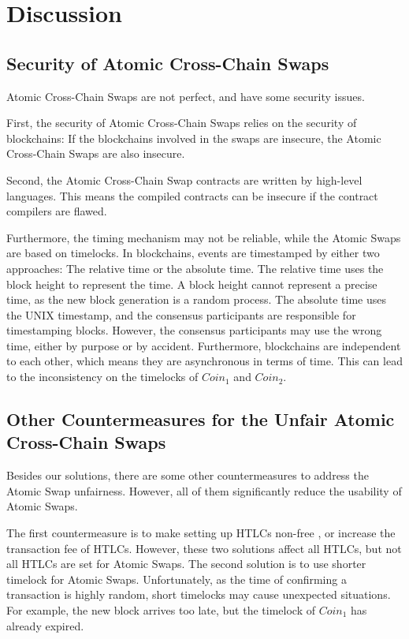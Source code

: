 \section{Discussion}
\label{sec:discussion}

\subsection{Security of Atomic Cross-Chain Swaps}

Atomic Cross-Chain Swaps are not perfect, and have some security issues.

First, the security of Atomic Cross-Chain Swaps relies on the security of blockchains:
If the blockchains involved in the swaps are insecure, the Atomic Cross-Chain Swaps are also insecure.

Second, the Atomic Cross-Chain Swap contracts are written by high-level languages.
This means the compiled contracts can be insecure if the contract compilers are flawed.

Furthermore, the timing mechanism may not be reliable, while the Atomic Swaps are based on timelocks.
In blockchains, events are timestamped by either two approaches: The relative time or the absolute time.
The relative time uses the block height to represent the time.
A block height cannot represent a precise time, as the new block generation is a random process.
The absolute time uses the UNIX timestamp, and the consensus participants are responsible for timestamping blocks.
However, the consensus participants may use the wrong time, either by purpose or by accident.
Furthermore, blockchains are independent to each other, which means they are asynchronous in terms of time.
This can lead to the inconsistency on the timelocks of $Coin_1$ and $Coin_2$.


\subsection{Other Countermeasures for the Unfair Atomic Cross-Chain Swaps}

Besides our solutions, there are some other countermeasures to address the Atomic Swap unfairness.
However, all of them significantly reduce the usability of Atomic Swaps.

The first countermeasure is to make setting up HTLCs non-free , or increase the transaction fee of HTLCs.
However, these two solutions affect all HTLCs, but not all HTLCs are set for Atomic Swaps.
The second solution is to use shorter timelock for Atomic Swaps.
Unfortunately, as the time of confirming a transaction is highly random,
short timelocks may cause unexpected situations.
For example, the new block arrives too late, but the timelock of $Coin_1$ has already expired.

